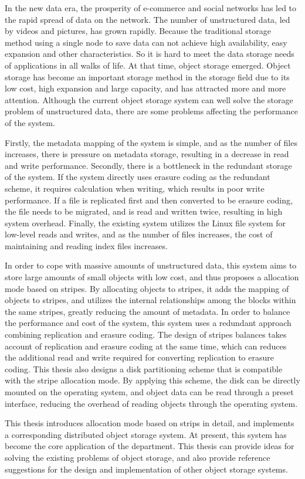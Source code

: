 \begin{abstract*}
In the new data era, the prosperity of e-commerce and social networks has led to the rapid spread of data on the network. The number of unstructured data, led by videos and pictures, has grown rapidly. Because the traditional storage method using a single node to save data can not achieve high availability, easy expansion and other characteristics. So it is hard to meet the data storage needs of applications in all walks of life. At that time, object storage emerged. Object storage has become an important storage method in the storage field due to its low cost, high expansion and large capacity, and has attracted more and more attention. Although the current object storage system can well solve the storage problem of unstructured data, there are some problems affecting the performance of the system.

Firstly, the metadata mapping of the system is simple, and as the number of files increases, there is pressure on metadata storage, resulting in a decrease in read and write performance. Secondly, there is a bottleneck in the redundant storage of the system. If the system directly uses erasure coding as the redundant scheme, it requires calculation when writing, which results in poor write performance. If a file is replicated first and then converted to be erasure coding, the file needs to be migrated, and is read and written twice, resulting in high system overhead. Finally, the existing system utilizes the Linux file system for low-level reads and writes, and as the number of files increases, the cost of maintaining and reading index files increases.

In order to cope with massive amounts of unstructured data, this system aims to store large amounts of small objects with low cost, and thus proposes a allocation mode based on stripes. By allocating objects to stripes, it adds the mapping of objects to stripes, and utilizes the internal relationships among the blocks within the same stripes, greatly reducing the amount of metadata. In order to balance the performance and cost of the system, this system uses a redundant approach combining replication and erasure coding. The design of stripes balances takes account of replication and erasure coding at the same time, which can reduces the additional read and write required for converting replication to erasure coding. This thesis also designs a disk partitioning scheme that is compatible with the stripe allocation mode. By applying this scheme, the disk can be directly mounted on the operating system, and object data can be read through a preset interface, reducing the overhead of reading objects through the operating system.

This thesis introduces allocation mode based on strips in detail, and implements a corresponding distributed object storage system. At present, this system has become the core application of the department. This thesis can provide ideas for solving the existing problems of object storage, and also provide reference suggestions for the design and implementation of other object storage systems.


\end{abstract*}
